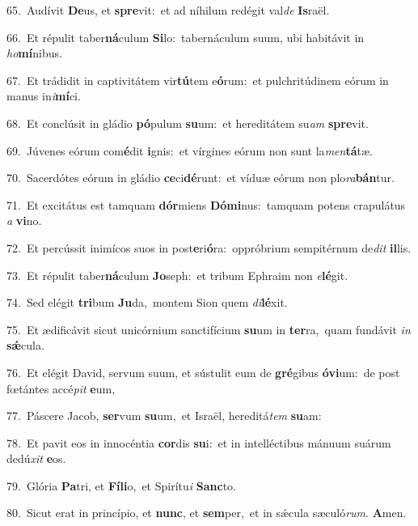 {\numbfont\textcolor{\numbcolor}{65.}}~Audívit \textbf{De}\-us, et \textbf{spre}\-vit:~\star et ad níhilum redégit val\textit{de} \textbf{Is}\-raël.\par
{\numbfont\textcolor{\numbcolor}{66.}}~Et répulit taber\-\textbf{ná}\-culum \textbf{Si}\-lo:~\star tabernáculum suum, ubi habitávit in \textit{ho}\-\textbf{mí}nibus.\par
{\numbfont\textcolor{\numbcolor}{67.}}~Et trádidit in captivitátem vir\-\textbf{tú}\-tem e\-\textbf{ó}\-rum:~\star et pulchritúdinem eórum in manus in\-\textit{i}\-\textbf{mí}ci.\par
{\numbfont\textcolor{\numbcolor}{68.}}~Et conclúsit in gládio \textbf{pó}\-pulum \textbf{su}\-um:~\star et hereditátem su\textit{am} \textbf{spre}\-vit.\par
{\numbfont\textcolor{\numbcolor}{69.}}~Júvenes eórum com\-\textbf{é}\-dit \textbf{i}\-gnis:~\star et vírgines eórum non sunt la\-\textit{men}\-\textbf{tá}tæ.\par
{\numbfont\textcolor{\numbcolor}{70.}}~Sacerdótes eórum in gládio \textbf{ce}\-ci\-\textbf{dé}\-runt:~\star et víduæ eórum non plo\-\textit{ra}\-\textbf{bán}tur.\par
{\numbfont\textcolor{\numbcolor}{71.}}~Et excitátus est tamquam \textbf{dór}\-miens \textbf{Dó}\-\textbf{mi}nus:~\star tamquam potens crapulátus \textit{a} \textbf{vi}\-no.\par
{\numbfont\textcolor{\numbcolor}{72.}}~Et percússit inimícos suos in post\-\textbf{e}\-ri\-\textbf{ó}\-ra:~\star oppróbrium sempitérnum de\textit{dit} \textbf{il}\-lis.\par
{\numbfont\textcolor{\numbcolor}{73.}}~Et répulit taber\-\textbf{ná}\-culum \textbf{Jo}\-seph:~\star et tribum Ephraim non \textit{e}\-\textbf{lé}git.\par
{\numbfont\textcolor{\numbcolor}{74.}}~Sed elégit \textbf{tri}\-bum \textbf{Ju}\-da,~\star montem Sion quem \textit{di}\-\textbf{lé}xit.\par
{\numbfont\textcolor{\numbcolor}{75.}}~Et ædificávit sicut unicórnium sanctifícium \textbf{su}\-um in \textbf{ter}\-ra,~\star quam fundávit \textit{in} \textbf{sǽ}\-cula.\par
{\numbfont\textcolor{\numbcolor}{76.}}~Et elégit David, servum suum, et sústulit eum de \textbf{gré}\-gibus \textbf{ó}\-\textbf{vi}um:~\star de post fœtántes accé\textit{pit} \textbf{e}\-um,\par
{\numbfont\textcolor{\numbcolor}{77.}}~Páscere Jacob, \textbf{ser}\-vum \textbf{su}\-um,~\star et Israël, hereditá\textit{tem} \textbf{su}\-am:\par
{\numbfont\textcolor{\numbcolor}{78.}}~Et pavit eos in innocéntia \textbf{cor}\-dis \textbf{su}\-i:~\star et in intelléctibus mánuum suárum dedú\textit{xit} \textbf{e}\-os.\par
{\numbfont\textcolor{\numbcolor}{79.}}~Glória \textbf{Pa}\-tri, et \textbf{Fí}\-\textbf{li}o,~\star et Spirítu\textit{i} \textbf{Sanc}\-to.\par
{\numbfont\textcolor{\numbcolor}{80.}}~Sicut erat in princípio, et \textbf{nunc}\-, et \textbf{sem}\-per,~\star et in sǽcula sæculó\-\textit{rum}\-. \textbf{A}\-men.\par
